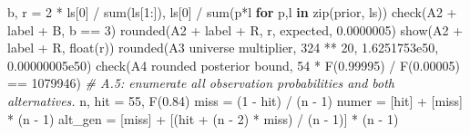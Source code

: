 \documentclass[
]{article}
\newenvironment{Shaded}{}{}
\newcommand{\BuiltInTok}[1]{\textcolor[rgb]{0.00,0.50,0.00}{#1}}
\newcommand{\CommentTok}[1]{\textcolor[rgb]{0.38,0.63,0.69}{\textit{#1}}}
\newcommand{\ControlFlowTok}[1]{\textcolor[rgb]{0.00,0.44,0.13}{\textbf{#1}}}
\newcommand{\DecValTok}[1]{\textcolor[rgb]{0.25,0.63,0.44}{#1}}
\newcommand{\FloatTok}[1]{\textcolor[rgb]{0.25,0.63,0.44}{#1}}
\newcommand{\KeywordTok}[1]{\textcolor[rgb]{0.00,0.44,0.13}{\textbf{#1}}}
\newcommand{\NormalTok}[1]{#1}
\newcommand{\OperatorTok}[1]{\textcolor[rgb]{0.40,0.40,0.40}{#1}}
\newcommand{\StringTok}[1]{\textcolor[rgb]{0.25,0.44,0.63}{#1}}
\begin{document}
\begin{Shaded}
\begin{Highlighting}[]
\NormalTok{        b, r }\OperatorTok{=} \DecValTok{2} \OperatorTok{*}\NormalTok{ ls[}\DecValTok{0}\NormalTok{] }\OperatorTok{/} \BuiltInTok{sum}\NormalTok{(ls[}\DecValTok{1}\NormalTok{:]), ls[}\DecValTok{0}\NormalTok{] }\OperatorTok{/} \BuiltInTok{sum}\NormalTok{(p}\OperatorTok{*}\NormalTok{l }\ControlFlowTok{for}\NormalTok{ p,l }\KeywordTok{in} \BuiltInTok{zip}\NormalTok{(prior, ls))}
\NormalTok{        check(}\StringTok{\textquotesingle{}A2 \textquotesingle{}} \OperatorTok{+}\NormalTok{ label }\OperatorTok{+} \StringTok{\textquotesingle{} B\textquotesingle{}}\NormalTok{, b }\OperatorTok{==} \DecValTok{3}\NormalTok{)}
\NormalTok{        rounded(}\StringTok{\textquotesingle{}A2 \textquotesingle{}} \OperatorTok{+}\NormalTok{ label }\OperatorTok{+} \StringTok{\textquotesingle{} R\textquotesingle{}}\NormalTok{, r, expected, }\FloatTok{0.0000005}\NormalTok{)}
\NormalTok{        show(}\StringTok{\textquotesingle{}A2 \textquotesingle{}} \OperatorTok{+}\NormalTok{ label }\OperatorTok{+} \StringTok{\textquotesingle{} R\textquotesingle{}}\NormalTok{, }\BuiltInTok{float}\NormalTok{(r))}
\NormalTok{    rounded(}\StringTok{\textquotesingle{}A3 universe multiplier\textquotesingle{}}\NormalTok{, }\DecValTok{324} \OperatorTok{**} \DecValTok{20}\NormalTok{, }\FloatTok{1.6251753e50}\NormalTok{, }\FloatTok{0.00000005e50}\NormalTok{)}
\NormalTok{    check(}\StringTok{\textquotesingle{}A4 rounded posterior bound\textquotesingle{}}\NormalTok{, }\DecValTok{54} \OperatorTok{*}\NormalTok{ F(}\StringTok{\textquotesingle{}0.99995\textquotesingle{}}\NormalTok{) }\OperatorTok{/}\NormalTok{ F(}\StringTok{\textquotesingle{}0.00005\textquotesingle{}}\NormalTok{) }\OperatorTok{==} \DecValTok{1079946}\NormalTok{)}
    \CommentTok{\# A.5: enumerate all observation probabilities and both alternatives.}
\NormalTok{    n, hit }\OperatorTok{=} \DecValTok{55}\NormalTok{, F(}\StringTok{\textquotesingle{}0.84\textquotesingle{}}\NormalTok{)}
\NormalTok{    miss }\OperatorTok{=}\NormalTok{ (}\DecValTok{1} \OperatorTok{{-}}\NormalTok{ hit) }\OperatorTok{/}\NormalTok{ (n }\OperatorTok{{-}} \DecValTok{1}\NormalTok{)}
\NormalTok{    numer }\OperatorTok{=}\NormalTok{ [hit] }\OperatorTok{+}\NormalTok{ [miss] }\OperatorTok{*}\NormalTok{ (n }\OperatorTok{{-}} \DecValTok{1}\NormalTok{)}
\NormalTok{    alt\_gen }\OperatorTok{=}\NormalTok{ [miss] }\OperatorTok{+}\NormalTok{ [(hit }\OperatorTok{+}\NormalTok{ (n }\OperatorTok{{-}} \DecValTok{2}\NormalTok{) }\OperatorTok{*}\NormalTok{ miss) }\OperatorTok{/}\NormalTok{ (n }\OperatorTok{{-}} \DecValTok{1}\NormalTok{)] }\OperatorTok{*}\NormalTok{ (n }\OperatorTok{{-}} \DecValTok{1}\NormalTok{)}

\end{Highlighting}
\end{Shaded}
\end{document}
